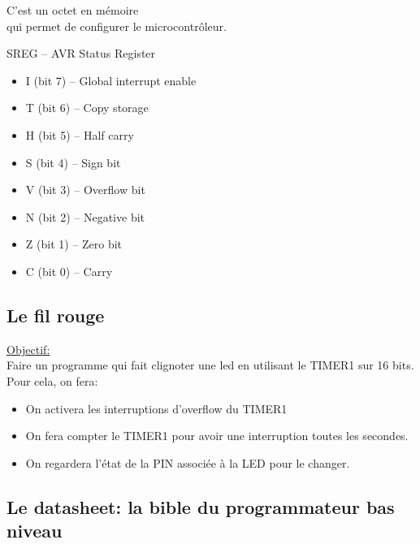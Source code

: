 \documentclass{beamer}
\begin{document}
\begin{frame}
  \begin{block}{}
    C'est un octet en m\'emoire\\
    \pause
    qui permet de configurer le microcontr\^oleur.
    \pause
  \end{block}
  \pause
  \begin{exampleblock}{SREG -- AVR Status Register}
    \begin{itemize}
      \pause
      \item I (bit 7) -- Global interrupt enable
      \pause
      \item T (bit 6) -- Copy storage
      \pause
      \item H (bit 5) -- Half carry
      \pause
      \item S (bit 4) -- Sign bit
      \pause
      \item V (bit 3) -- Overflow bit
      \pause
      \item N (bit 2) -- Negative bit
      \pause
      \item Z (bit 1) -- Zero bit
      \pause
      \item C (bit 0) -- Carry
    \end{itemize}
  \end{exampleblock}
\end{frame}

\subsection{Le fil rouge}

\begin{frame}
  \underline{Objectif:}\\
  Faire un programme qui fait clignoter une led en utilisant le TIMER1 sur 16 bits.\\Pour cela, on fera:\\
  \begin{itemize}
    \pause
    \item On activera les interruptions d'overflow du TIMER1
    \pause
    \item On fera compter le TIMER1 pour avoir une interruption toutes les secondes.
    \pause
    \item On regardera l'\'etat de la PIN associ\'ee \`a la LED pour le changer.
  \end{itemize}
\end{frame}


\subsection{Le datasheet: la bible du programmateur bas niveau}
\end{document}
